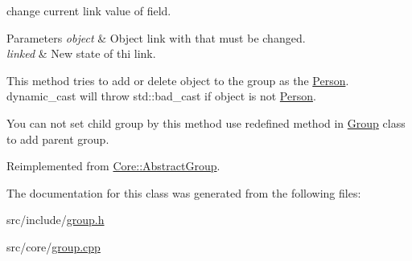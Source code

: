 change current link value of field. 


\begin{DoxyParams}{Parameters}
{\em object} & Object link with that must be changed. \\
\hline
{\em linked} & New state of thi link.\\
\hline
\end{DoxyParams}
This method tries to add or delete object to the group as the \hyperlink{classCore_1_1Person}{Person}. dynamic\_\-cast will throw std::bad\_\-cast if object is not \hyperlink{classCore_1_1Person}{Person}.

You can not set child group by this method use redefined method in \hyperlink{classCore_1_1Group}{Group} class to add parent group. 

Reimplemented from \hyperlink{classCore_1_1AbstractGroup_a1b3a59bf11da1ea7bd9a0735cb54dbb8}{Core::AbstractGroup}.



The documentation for this class was generated from the following files:\begin{DoxyCompactItemize}
\item 
src/include/\hyperlink{include_2group_8h}{group.h}\item 
src/core/\hyperlink{core_2group_8cpp}{group.cpp}\end{DoxyCompactItemize}
